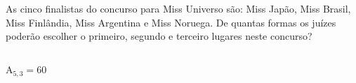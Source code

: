 \begin{ex}
 	As cinco finalistas do concurso para Miss Universo são: Miss Japão, Miss Brasil, Miss Finlândia, Miss Argentina e Miss Noruega. De quantas formas os juízes poderão escolher o primeiro, segundo e terceiro lugares neste concurso?
 	  \begin{sol}
 	  \phantom{A} \\
 	  $\mathrm{A}_{5,3}=60$
 	  \end{sol}
\end{ex}